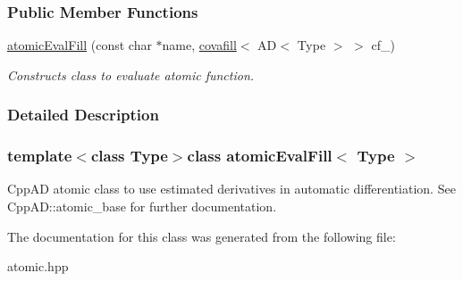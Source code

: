 \subsubsection*{Public Member Functions}
\begin{DoxyCompactItemize}
\item 
\hypertarget{classatomicEvalFill_af03c332649d669228d335f86981df5b7}{}\hyperlink{classatomicEvalFill_af03c332649d669228d335f86981df5b7}{atomic\+Eval\+Fill} (const char $\ast$name, \hyperlink{classcovafill}{covafill}$<$ A\+D$<$ Type $>$ $>$ cf\+\_\+)\label{classatomicEvalFill_af03c332649d669228d335f86981df5b7}

\begin{DoxyCompactList}\small\item\em Constructs class to evaluate atomic function. \end{DoxyCompactList}\end{DoxyCompactItemize}


\subsubsection{Detailed Description}
\subsubsection*{template$<$class Type$>$class atomic\+Eval\+Fill$<$ Type $>$}

Cpp\+A\+D atomic class to use estimated derivatives in automatic differentiation. See Cpp\+A\+D\+::atomic\+\_\+base for further documentation. 

The documentation for this class was generated from the following file\+:\begin{DoxyCompactItemize}
\item 
atomic.\+hpp\end{DoxyCompactItemize}
